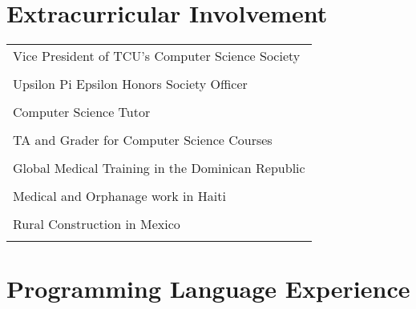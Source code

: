 \documentclass[10pt]{article} %
\begin{document}
\begin{minipage}[t]{0.44\textwidth}
\section{\color{section} \sffamily Extracurricular Involvement}
\begin{tabular}{l}
	Vice President of TCU's Computer Science Society \\ \hfill \\
	Upsilon Pi Epsilon Honors Society Officer \\ \hfill \\
	Computer Science Tutor \\ \hfill \\
	TA and Grader for Computer Science Courses \\ \hfill \\ 
	Global Medical Training in the Dominican Republic \\ \hfill \\
	Medical and Orphanage work in Haiti \\ \hfill \\
	Rural Construction in Mexico \\ \hfill \\
\end{tabular}



\section{\color{section} \sffamily Programming Language Experience} 


\end{minipage}
\end{document}
